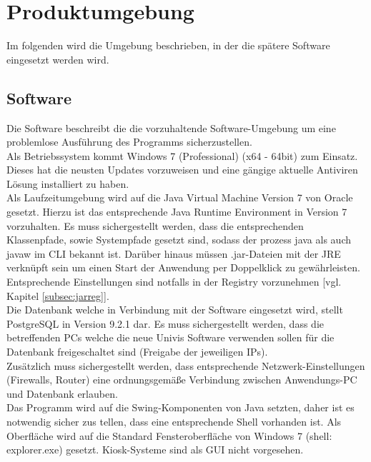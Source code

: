 \section{Produktumgebung}
\label{sec:Produktumgebung}

Im folgenden wird die Umgebung beschrieben, in der die spätere Software eingesetzt werden wird.

\subsection{Software}
\label{subsec:software}

Die Software beschreibt die die vorzuhaltende Software-Umgebung um eine problemlose Ausführung des Programms sicherzustellen.\\


Als Betriebssystem kommt Windows 7 (Professional) (x64 - 64bit) zum Einsatz. Dieses hat die neusten Updates vorzuweisen und eine gängige aktuelle Antiviren Lösung installiert zu haben.\\

Als Laufzeitumgebung wird auf die Java Virtual Machine Version 7 von Oracle gesetzt.
Hierzu ist das entsprechende Java Runtime Environment in Version 7 vorzuhalten. Es muss sichergestellt werden, dass die entsprechenden Klassenpfade, sowie Systempfade gesetzt sind, sodass der prozess java als auch javaw im CLI bekannt ist. Darüber hinaus müssen .jar-Dateien mit der JRE verknüpft sein um einen Start der Anwendung per Doppelklick zu gewährleisten. Entsprechende Einstellungen sind notfalls in der Registry vorzunehmen [vgl. Kapitel \ref{subsec:jarreg}].\\

Die Datenbank welche in Verbindung mit der Software eingesetzt wird, stellt PostgreSQL in Version 9.2.1 dar.
Es muss sichergestellt werden, dass die betreffenden PCs welche die neue Univis Software verwenden sollen für die Datenbank freigeschaltet sind (Freigabe der jeweiligen IPs).\\

Zusätzlich muss sichergestellt werden, dass entsprechende Netzwerk-Einstellungen (Firewalls, Router) eine ordnungsgemäße Verbindung zwischen Anwendungs-PC und Datenbank erlauben.\\

Das Programm wird auf die Swing-Komponenten von Java setzten, daher ist es notwendig sicher zus tellen, dass eine entsprechende Shell vorhanden ist.
Als Oberfläche wird auf die Standard Fensteroberfläche von Windows 7 (shell: explorer.exe) gesetzt. Kiosk-Systeme sind als GUI nicht vorgesehen. \\


